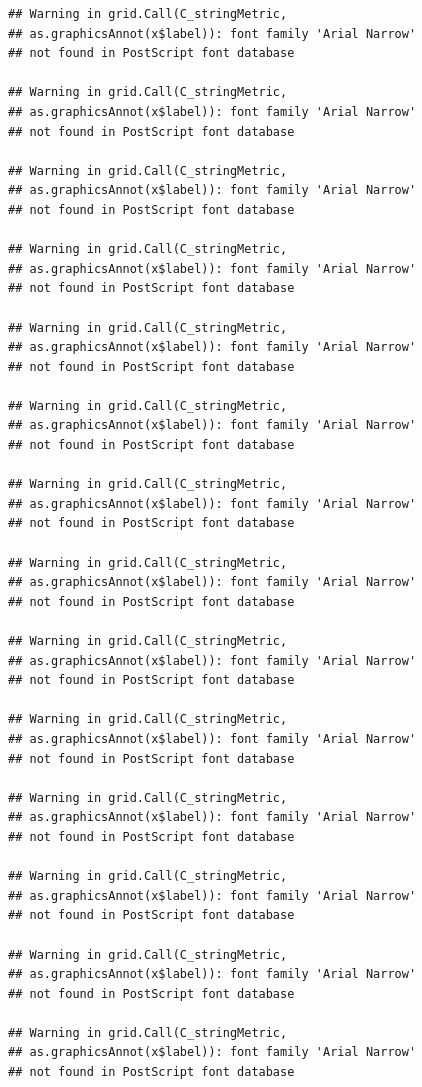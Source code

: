 \documentclass[]{krantz}
\begin{document}
\begin{verbatim}
## Warning in grid.Call(C_stringMetric,
## as.graphicsAnnot(x$label)): font family 'Arial Narrow'
## not found in PostScript font database

## Warning in grid.Call(C_stringMetric,
## as.graphicsAnnot(x$label)): font family 'Arial Narrow'
## not found in PostScript font database

## Warning in grid.Call(C_stringMetric,
## as.graphicsAnnot(x$label)): font family 'Arial Narrow'
## not found in PostScript font database

## Warning in grid.Call(C_stringMetric,
## as.graphicsAnnot(x$label)): font family 'Arial Narrow'
## not found in PostScript font database

## Warning in grid.Call(C_stringMetric,
## as.graphicsAnnot(x$label)): font family 'Arial Narrow'
## not found in PostScript font database

## Warning in grid.Call(C_stringMetric,
## as.graphicsAnnot(x$label)): font family 'Arial Narrow'
## not found in PostScript font database

## Warning in grid.Call(C_stringMetric,
## as.graphicsAnnot(x$label)): font family 'Arial Narrow'
## not found in PostScript font database

## Warning in grid.Call(C_stringMetric,
## as.graphicsAnnot(x$label)): font family 'Arial Narrow'
## not found in PostScript font database

## Warning in grid.Call(C_stringMetric,
## as.graphicsAnnot(x$label)): font family 'Arial Narrow'
## not found in PostScript font database

## Warning in grid.Call(C_stringMetric,
## as.graphicsAnnot(x$label)): font family 'Arial Narrow'
## not found in PostScript font database

## Warning in grid.Call(C_stringMetric,
## as.graphicsAnnot(x$label)): font family 'Arial Narrow'
## not found in PostScript font database

## Warning in grid.Call(C_stringMetric,
## as.graphicsAnnot(x$label)): font family 'Arial Narrow'
## not found in PostScript font database

## Warning in grid.Call(C_stringMetric,
## as.graphicsAnnot(x$label)): font family 'Arial Narrow'
## not found in PostScript font database

## Warning in grid.Call(C_stringMetric,
## as.graphicsAnnot(x$label)): font family 'Arial Narrow'
## not found in PostScript font database
\end{verbatim}
\end{document}
